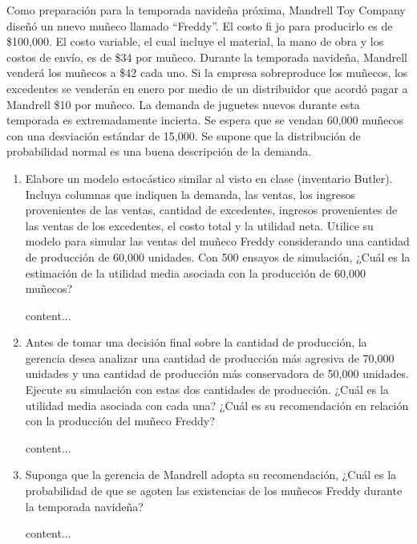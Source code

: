 \begin{problema}
	Como preparación para la temporada navideña próxima, Mandrell Toy Company diseñó un nuevo muñeco llamado “Freddy”. El costo fi jo para producirlo es de \$100,000. El costo variable, el cual incluye el material, la mano de obra y los costos de envío, es de \$34 por muñeco. Durante la temporada navideña, Mandrell venderá los muñecos a \$42 cada uno. Si la empresa sobreproduce los muñecos, los excedentes se venderán en enero por medio de un distribuidor que acordó pagar a Mandrell \$10 por muñeco. La demanda de juguetes nuevos durante esta temporada es extremadamente incierta. Se espera que se vendan 60,000 muñecos con una desviación estándar de 15,000. Se supone que la distribución de probabilidad normal es una buena descripción de la demanda.
	\begin{enumerate}
		\item Elabore un modelo estocástico similar al visto en clase (inventario Butler). Incluya columnas que indiquen la demanda, las ventas, los ingresos provenientes de las ventas, cantidad de excedentes, ingresos provenientes de las ventas de los excedentes, el costo total y la utilidad neta. Utilice su modelo para simular las ventas del muñeco Freddy considerando una cantidad de producción de 60,000 unidades. Con 500 ensayos de simulación, ¿Cuál es la estimación de la utilidad media asociada con la producción de 60,000 muñecos?
	\begin{sol}
		content...
	\end{sol}
		\item Antes de tomar una decisión final sobre la cantidad de producción, la gerencia desea analizar una cantidad de producción más agresiva de 70,000 unidades y una cantidad de producción más conservadora de 50,000 unidades. Ejecute su simulación con estas dos cantidades de producción. ¿Cuál es la utilidad media asociada con cada una? ¿Cuál es su recomendación en relación con la producción del muñeco Freddy? 
			\begin{sol}
			content...
		\end{sol}
		\item Suponga que la gerencia de Mandrell adopta su recomendación, ¿Cuál es la probabilidad de que se agoten las existencias de los muñecos Freddy durante la temporada navideña? 
			\begin{sol}
			content...
		\end{sol}
	\end{enumerate}
\end{problema}


